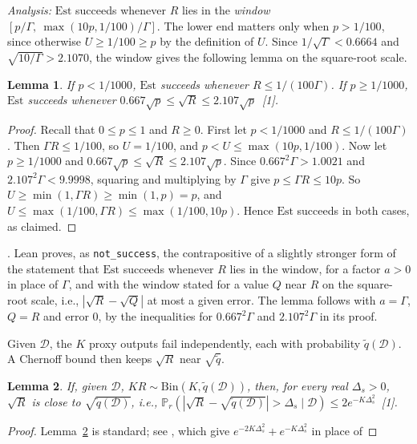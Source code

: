 \documentclass[10pt]{article}
\newcommand{\leanmark}[1]{{\relscale{0.78}\color{gray}[#1]}}
\newenvironment{leanitems}{\par\smallskip\relscale{0.78}\color{gray}\hypersetup{urlcolor=gray}\raggedright%
  \begin{list}{}{\setlength{\leftmargin}{2em}\setlength{\labelwidth}{1.6em}%
  \setlength{\labelsep}{0.4em}\setlength{\itemsep}{0pt}\setlength{\topsep}{0pt}%
  \setlength{\parsep}{0pt}}}{\end{list}\par\medskip}
\newtheorem{lemma}{Lemma}
\newcommand{\Dd}{\mathcal{D}}\newcommand{\Ee}{\mathcal{E}}
\newcommand{\Est}{\mathrm{Est}}
\newcommand{\PP}{\mathbb{P}}
\begin{document}
\begin{enumerate}[leftmargin=*,itemsep=8pt,topsep=10pt plus 2pt]
  \emph{Analysis:} $\Est$ succeeds whenever $R$ lies in the \emph{window}
  $[p/\Gamma,\ \max(10p,1/100)/\Gamma]$. The lower end matters only when
  $p>1/100$, since otherwise $U\ge1/100\ge p$ by the definition of $U$. Since $1/\sqrt\Gamma<0.6664$
  and $\sqrt{10/\Gamma}>2.1070$, the window gives the following lemma on the
  square-root scale.
  \begin{lemma}\label{lem:window}
    If $p<1/1000$, $\Est$ succeeds whenever $R\le1/(100\Gamma)$. If
    $p\ge1/1000$, $\Est$ succeeds whenever
    $0.667\sqrt p\le\sqrt R\le2.107\sqrt p$~\leanmark{1}.
  \end{lemma}
  \begin{proof}
  Recall that $0\le p\le1$ and $R\ge0$. First let $p<1/1000$ and
  $R\le1/(100\Gamma)$. Then $\Gamma R\le1/100$, so $U=1/100$, and
  $p<U\le\max(10p,1/100)$. Now let $p\ge1/1000$ and
  $0.667\sqrt p\le\sqrt R\le2.107\sqrt p$. Since $0.667^2\Gamma>1.0021$ and
  $2.107^2\Gamma<9.9998$, squaring and multiplying by $\Gamma$ give $p\le\Gamma R\le10p$. So
  $U\ge\min(1,\Gamma R)\ge\min(1,p)=p$, and
  $U\le\max(1/100,\Gamma R)\le\max(1/100,10p)$. Hence $\Est$ succeeds in both
  cases, as claimed.
  \end{proof}
  \begin{leanitems}
  . Lean proves, as \texttt{not\_success}, the
  contrapositive of a slightly stronger form of the statement that $\Est$ succeeds whenever $R$ lies in
  the window, for a factor $a>0$ in place
  of $\Gamma$, and with the window stated for a value $Q$ near $R$ on the
  square-root scale, i.e., $|\sqrt R-\sqrt Q|$ at most a given error. The
  lemma follows with $a=\Gamma$, $Q=R$ and error $0$, by the inequalities for $0.667^2\Gamma$ and
  $2.107^2\Gamma$ in its proof.
  \end{leanitems}
  Given $\Dd$, the $K$ proxy outputs fail independently, each with
  probability $\tilde q(\Dd)$. A Chernoff bound then keeps $\sqrt R$ near
  $\sqrt{\tilde q}$.
  \begin{lemma}\label{lem:chernoff}
    If, given $\Dd$, $KR\sim\mathrm{Bin}(K,\tilde q(\Dd))$, then, for
    every real $\Delta_s>0$, $\sqrt R$ is close to $\sqrt{\tilde q(\Dd)}$,
    i.e.,
    $\PP_r(|\sqrt R-\sqrt{\tilde q(\Dd)}|>\Delta_s\mid\Dd)\le2e^{-K\Delta_s^2}$~\leanmark{1}.
  \end{lemma}
  \begin{proof}
  Lemma~\ref{lem:chernoff} is standard; see \citet[Theorems~3--4]{okamoto-1958},
  which give $e^{-2K\Delta_s^2}+e^{-K\Delta_s^2}$ in place of

\end{proof}
\end{enumerate}
\end{document}
